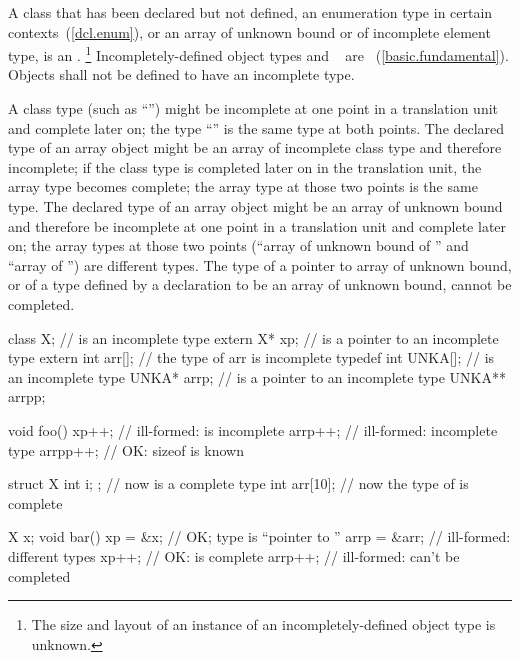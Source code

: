\pnum
{}%
A class that has been declared but not defined, an enumeration type in certain
contexts~(\ref{dcl.enum}), or an array of unknown
bound or of incomplete element type, is an
.%
\footnote{The size and layout of an instance of an incompletely-defined
object type is unknown.}
Incompletely-defined object types and \cv{}~ are
~(\ref{basic.fundamental}).
Objects shall not be defined to have an
incomplete type.

\pnum
A class type (such as ``'') might be incomplete at one
point in a translation unit and complete later on; the type
``'' is the same type at both points. The declared type
of an array object might be an array of incomplete class type and
therefore incomplete; if the class type is completed later on in the
translation unit, the array type becomes complete; the array type at
those two points is the same type. The declared type of an array object
might be an array of unknown bound and therefore be incomplete at one
point in a translation unit and complete later on; the array types at
those two points (``array of unknown bound of '' and ``array of
 '') are different types. The type of a pointer to array of
unknown bound, or of a type defined by a  declaration to
be an array of unknown bound, cannot be completed. \begin{example}

%
\begin{codeblock}
class X;                        //  is an incomplete type
extern X* xp;                   //  is a pointer to an incomplete type
extern int arr[];               // the type of arr is incomplete
typedef int UNKA[];             //  is an incomplete type
UNKA* arrp;                     //  is a pointer to an incomplete type
UNKA** arrpp;

void foo() {
  xp++;                         // ill-formed:  is incomplete
  arrp++;                       // ill-formed: incomplete type
  arrpp++;                      // OK: sizeof  is known
}

struct X { int i; };            // now  is a complete type
int  arr[10];                   // now the type of  is complete

X x;
void bar() {
  xp = &x;                      // OK; type is ``pointer to ''
  arrp = &arr;                  // ill-formed: different types
  xp++;                         // OK:   is complete
  arrp++;                       // ill-formed:  can't be completed
}
\end{codeblock}
\end{example}

